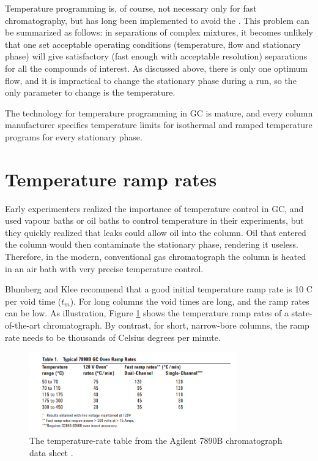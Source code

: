 Temperature programming is, of course, not necessary only for fast
chromatography, but has long been implemented to avoid the  \autocite[p. 779]{Skoog2007}. This problem can be summarized as
follows: in separations of complex mixtures, it becomes unlikely that one set
acceptable operating conditions (temperature, flow and stationary phase) will
give satisfactory (fast enough with acceptable resolution) separations for all
the compounds of interest. As discussed above, there is only one optimum flow,
and it is impractical to change the stationary phase during a run, so the only
parameter to change is the temperature.

The technology for temperature programming in GC is mature, and every column
manufacturer specifies temperature limits for isothermal and ramped temperature
programs for every stationary phase.

\section{Temperature ramp rates}
\label{sec:RampRates}
Early experimenters realized the importance of temperature control in GC, and
used vapour baths \autocite{Desty1957} or oil baths \autocite{Eggertsen1956} to
control temperature in their experiments, but they quickly realized that leaks
could allow oil into the column. Oil that entered the column would then
contaminate the stationary phase, rendering it useless. Therefore, in the
modern, conventional gas chromatograph the column is heated in an air bath with
very precise temperature control.

Blumberg and Klee \autocite{Blumberg2000} recommend that a good initial
temperature ramp rate is 10 C\textdegree{} per void time ($t_m$). For long
columns the void times are long, and the ramp rates can be low. As illustration,
Figure \ref{fig:RampRate7890B} shows the temperature ramp rates of a
state-of-the-art chromatograph. By contrast, for short, narrow-bore columns, the
ramp rate needs to be thousands of Celsius degrees per minute.

\begin{figure}
	\centering
	\includegraphics[width=0.8\textwidth]{Figures/7890B.png}
	\decoRule
	\caption[A temperature-rate table from the Agilent7890B data sheet]{The
	temperature-rate table from the Agilent 7890B chromatograph data sheet
	\autocite{7890B}. }
	\label{fig:RampRate7890B}
\end{figure}

